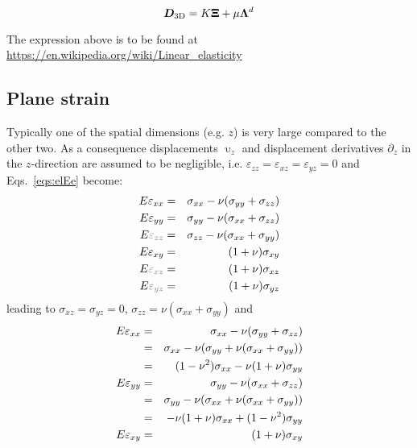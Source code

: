 \begin{mdframed}[backgroundcolor=blue!5]
\[
{\bm D}_{\rm 3D}  =K {\bm \Xi} + \mu {\bm \Lambda}^d
\]
\end{mdframed}

The expression above is to be found at \url{https://en.wikipedia.org/wiki/Linear_elasticity}



\newpage
\subsection{Plane strain \label{ss:elpstrain}}
Typically one of the spatial dimensions (e.g. $z$)
is very large compared to the other two. 
As a consequence displacements $\upupsilon_z$ and 
displacement derivatives $\partial_z$ in the 
$z$-direction are assumed to be negligible, i.e. $\varepsilon_{zz}=\varepsilon_{xz}=\varepsilon_{yz}=0$
and Eqs.~\eqref{eqs:elEe} become:
\begin{eqnarray}
E \varepsilon_{xx} &=&  \sigma_{xx} - \nu (\sigma_{yy}+\sigma_{zz}) \nn\\
E \varepsilon_{yy} &=&  \sigma_{yy} - \nu (\sigma_{xx}+\sigma_{zz}) \nn\\
E {\color{gray}\varepsilon_{zz}} &=&  \sigma_{zz} - \nu (\sigma_{xx}+\sigma_{yy}) \nn\\
E \varepsilon_{xy} &=&  (1+\nu) \sigma_{xy} \nn\\
E {\color{gray}\varepsilon_{xz}} &=&  (1+\nu) \sigma_{xz} \nn\\
E {\color{gray}\varepsilon_{yz}} &=&  (1+\nu) \sigma_{yz} \nn 
\end{eqnarray}
leading to $\sigma_{xz}=\sigma_{yz}=0$, $\sigma_{zz}=\nu(\sigma_{xx}+\sigma_{yy})$
and
\begin{eqnarray}
E \varepsilon_{xx} 
&=&  \sigma_{xx} - \nu (\sigma_{yy}+\sigma_{zz}) \nonumber\\
&=&  \sigma_{xx} - \nu (\sigma_{yy}+ \nu(\sigma_{xx}+\sigma_{yy})) \nonumber\\
&=& (1-\nu^2) \sigma_{xx} - \nu (1+\nu ) \sigma_{yy} \nonumber\\
E \varepsilon_{yy} 
&=&  \sigma_{yy} - \nu (\sigma_{xx}+\sigma_{zz}) \nonumber\\
&=&  \sigma_{yy} - \nu (\sigma_{xx}+ \nu(\sigma_{xx}+\sigma_{yy})) \nonumber\\
&=& -\nu(1+\nu) \sigma_{xx} + (1-\nu^2) \sigma_{yy} \nonumber\\
E \varepsilon_{xy} &=&  (1+\nu) \sigma_{xy} \nonumber
\end{eqnarray}
